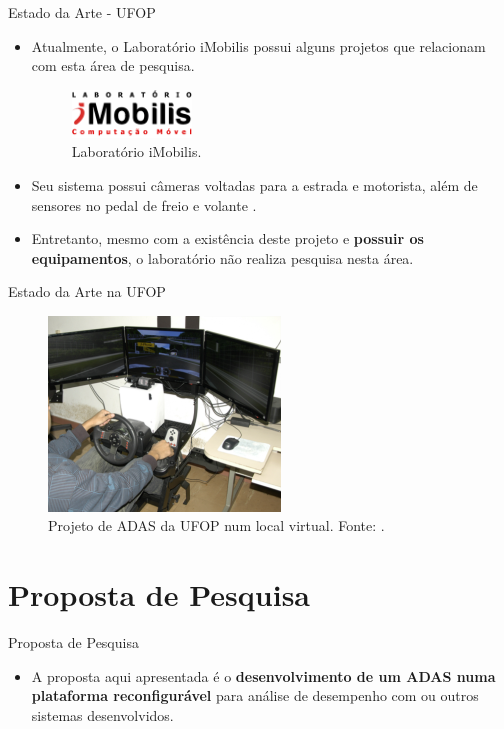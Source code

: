 \documentclass[aspectratio=169]{beamer}
\begin{document}
\begin{frame}{Estado da Arte - UFOP}
	\begin{itemize}
		\item Atualmente, o Laboratório iMobilis possui alguns projetos que relacionam com esta área de pesquisa. 
		
		\begin{figure}[H]
			\centering
			\includegraphics[width=0.3\textwidth]{img/imobilis.png}
			\caption{Laboratório iMobilis.}
			\label{fig:ufop}
		\end{figure}
		
			\bigskip
		
		\item Seu sistema possui câmeras voltadas para a estrada e motorista, além de sensores no pedal de freio e volante \cite{kitt}. 
		
			\bigskip
		
		\item Entretanto, mesmo com a existência deste projeto e \textbf{possuir os equipamentos}, o laboratório não realiza pesquisa nesta área.
		
	\end{itemize}
\end{frame}


\begin{frame}{Estado da Arte na UFOP}
	\begin{figure}[H]
		\centering
		\includegraphics[width=0.55\textwidth]{img/foto1.png}
		\caption{Projeto de ADAS da UFOP num local virtual. Fonte: \cite{kitt}.}
		\label{fig:naoponderado}
	\end{figure}
\end{frame}

\section{Proposta de Pesquisa}
\begin{frame}{Proposta de Pesquisa}
	\begin{itemize}
		\item A proposta aqui apresentada é o \textbf{desenvolvimento de um ADAS numa plataforma reconfigurável} para análise de desempenho com ou outros sistemas desenvolvidos.
	\end{itemize}
\end{frame}
\end{document}
